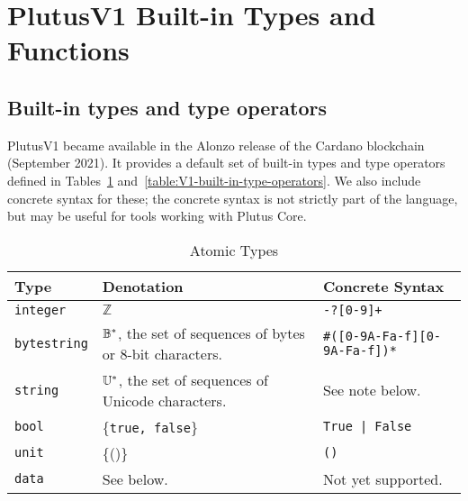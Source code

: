 \newcommand{\note}[1]{
  \bigskip
  \refstepcounter{notenumberA}
  \noindent\textbf{Note \thenotenumberA. #1}
}

\newcommand{\utfeight}{\mathsf{utf8}}
\newcommand{\unutfeight}{\mathsf{utf8}^{-1}}
\newcommand{\vk}{\textit{vk}}  %
\newpage

\section{PlutusV1 Built-in Types and Functions}
\label{appendix:default-builtins-V1}

\subsection{Built-in types and type operators}
\label{sec:V1-built-in-types}
PlutusV1 became available in the Alonzo release of the Cardano blockchain
(September 2021). It provides a default set of built-in types and type operators
defined in Tables~\ref{table:V1-built-in-types}
and~\ref{table:V1-built-in-type-operators}.  We also include concrete syntax for
these; the concrete syntax is not strictly part of the language, but may be
useful for tools working with Plutus Core.

\begin{table}[H]
  \centering
    \begin{tabular}{|l|p{6cm}|l|}
        \hline
        Type & Denotation & Concrete Syntax\\
        \hline
        \texttt{integer} &   $\mathbb{Z}$ & \texttt{-?[0-9]+}\\
        \texttt{bytestring}  & $ \mathbb{B}^*$, the set of sequences of bytes or 8-bit characters. & \texttt{\#([0-9A-Fa-f][0-9A-Fa-f])*}\\
        \texttt{string} & $\mathbb{U}^*$,  the set of sequences of Unicode characters. & See note below.\\
        \texttt{bool} & \{\texttt{true, false}\} & \texttt{True | False}\\
        \texttt{unit} &  \{()\} & \texttt{()}\\
        \texttt{data} &  See below. & Not yet supported.\\
        \hline
    \end{tabular}
    \caption{Atomic Types}
    \label{table:V1-built-in-types}
\end{table}

